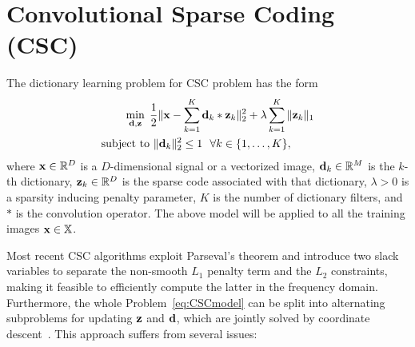 \section{Convolutional Sparse Coding (CSC)} \label{CSCmodel}
The dictionary learning problem for CSC problem has the form
\begin{equation}\label{eq:CSCmodel}
\begin{split}
    \mini{\filter,\code} & \frac{1}{2}\|\signal - \sum_{k=1}^{K} \filter_k * \code_k \|_2^2 + \lambda \sum_{k=1}^{K}\| \code_k \|_1 \\
    \text{subject to} & ~ \|\filter_k\|^2_2 \leq 1 ~~ \forall k \in \{1,\dots,K\},
\end{split}
\end{equation}
where $\signal \in \mathbb{R}^D$ is a $D$-dimensional signal or a
vectorized image,
$\filter_k \in \mathbb{R}^M$ is the $k$-th dictionary, $\code_k\in
\mathbb{R}^D$ is the sparse code associated with that dictionary,
$\lambda>0$ is a sparsity inducing penalty parameter, $K$ is the
number of dictionary filters, and $*$ is the convolution operator. The
above model will be applied to all the training images
$\signal\in\mathbb{X}$.

Most recent CSC algorithms exploit Parseval's theorem and introduce
two slack variables to separate the non-smooth $L_1$ penalty term and
the $L_2$ constraints, making it feasible to efficiently compute the
latter in the frequency domain. Furthermore, the whole
Problem~\eqref{eq:CSCmodel} can be split into alternating subproblems
for updating $\code$ and $\filter$, which are jointly solved by
coordinate
descent~\cite{bristow2013fast,heide2015fast,wohlberg2016efficient}. This
approach suffers from several issues:


